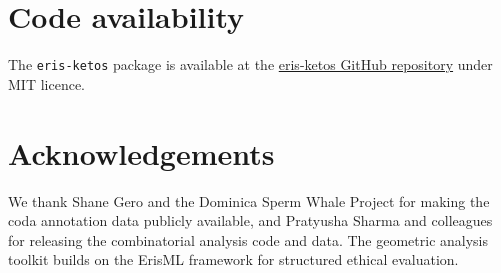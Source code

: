 \documentclass[11pt,a4paper]{article}
\begin{document}
\section*{Code availability}
The \texttt{eris-ketos} package is available at the
\href{https://github.com/ahb-sjsu/eris-ketos}{eris-ketos GitHub repository}
under MIT licence.

\section*{Acknowledgements}
We thank Shane Gero and the Dominica Sperm Whale Project for making the
coda annotation data publicly available, and Pratyusha Sharma and
colleagues for releasing the combinatorial analysis code and data. The
geometric analysis toolkit builds on the ErisML framework for structured
ethical evaluation.



\end{document}
